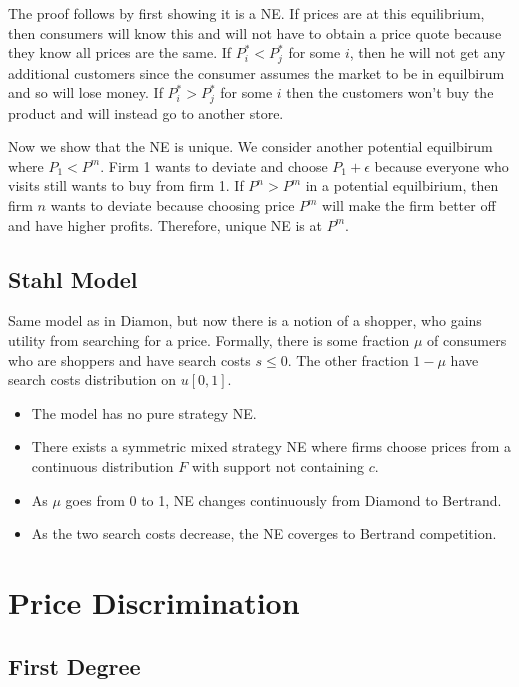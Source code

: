 \documentclass[12pt]{article}
\begin{document}
The proof follows by first showing it is a NE. If prices are at this equilibrium, then consumers will know this and will not have to obtain a price quote because they know all prices are the same. If $P_i^* < P_j^*$ for some $i$, then he will not get any additional customers since the consumer assumes the market to be in equilbirum and so will lose money. If $P_i^* > P_j^*$ for some $i$ then the customers won't buy the product and will instead go to another store.

Now we show that the NE is unique. We consider another potential equilbirum where $P_1 < P^m$. Firm 1 wants to deviate and choose $P_1 + \epsilon$ because everyone who visits still wants to buy from firm 1. If $P^n > P^m$ in a potential equilbirium, then firm $n$ wants to deviate because choosing price $P^m$ will make the firm better off and have higher profits. Therefore, unique NE is at $P^m$. 

\subsection{Stahl Model}

Same model as in Diamon, but now there is a notion of a shopper, who gains utility from searching for a price. Formally, there is some fraction $\mu$ of consumers who are shoppers and have search costs $s \leq 0$. The other fraction $1 - \mu$ have search costs distribution on $u[0,1]$. 

\begin{itemize}
\item The model has no pure strategy NE.
\item There exists a symmetric mixed strategy NE where firms choose prices from a continuous distribution $F$ with support not containing $c$.
\item As $\mu$ goes from 0 to 1, NE changes continuously from Diamond to Bertrand. 
\item As the two search costs decrease, the NE coverges to Bertrand competition.
\end{itemize}

\section{Price Discrimination}

\subsection{First Degree}
\end{document}
